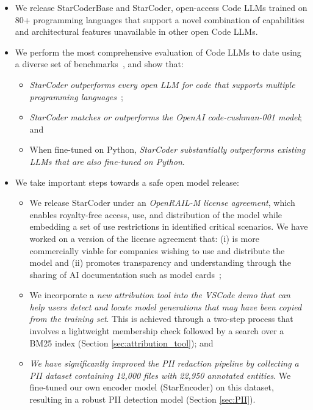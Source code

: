 \documentclass[10pt]{article} %
\begin{document}
\begin{itemize}
    \item We release StarCoderBase and StarCoder, open-access Code LLMs trained on 80+ programming languages that support a novel combination of capabilities and architectural features unavailable in other open Code LLMs.
    \item We perform the most comprehensive evaluation of Code LLMs to date using a diverse set of benchmarks~\citep{Lai2022DS1000,cassano2022multiple,pearce2022copilotsec,fried2022incoder,yee:typeweaver,austin2021program,chen2021codex,bigcode-evaluation-harness,hendrycks2020mmlu,reddy2019coqa,cobbe2021training, nadeem_stereoset_2021,gehman_realtoxicityprompts_2020,liang2022helm}, and show that:
    \begin{itemize}
        \item \emph{StarCoder outperforms every open LLM for code that supports multiple programming languages}~\citep{nijkamp:codegen,qinkai:codegeex};
        \item \emph{StarCoder matches or outperforms the OpenAI code-cushman-001 model}; and
        \item When fine-tuned on Python, \emph{StarCoder substantially outperforms existing LLMs that are also fine-tuned on Python}. %
    \end{itemize}
    \item We take important steps towards a safe open model release: 
    \begin{itemize}
        \item We release StarCoder under an \emph{OpenRAIL-M license agreement}, which enables royalty-free access, use, and distribution of the model while embedding a set of use restrictions in identified critical scenarios. We have worked on a version of the license agreement that: (i) is more commercially viable for companies wishing to use and distribute the model and (ii) promotes transparency and understanding through the sharing of AI documentation such as model cards~\citep{mitchell2019modelcard};
        \item We incorporate a \emph{new attribution tool into the VSCode demo that can help users detect and locate model generations that may have been copied from the training set}. This is achieved through a two-step process that involves a lightweight membership check followed by a search over a BM25 index (Section \ref{sec:attribution_tool}); and 
        \item \emph{We have significantly improved the PII redaction pipeline by collecting a PII dataset containing 12,000 files with 22,950 annotated entities}. We fine-tuned our own encoder model (StarEncoder) on this dataset, resulting in a robust PII detection model (Section \ref{sec:PII}). 
    \end{itemize}
\end{itemize}
\end{document}
